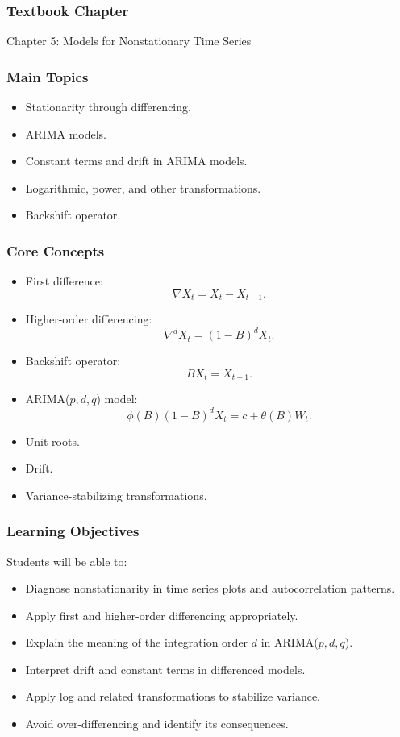 \documentclass[11pt]{article}
\begin{document}
\subsubsection*{Textbook Chapter}
Chapter 5: Models for Nonstationary Time Series

\subsubsection*{Main Topics}
\begin{itemize}
    \item Stationarity through differencing.
    \item ARIMA models.
    \item Constant terms and drift in ARIMA models.
    \item Logarithmic, power, and other transformations.
    \item Backshift operator.
\end{itemize}

\subsubsection*{Core Concepts}
\begin{itemize}
    \item First difference:
    \[
        \nabla X_t = X_t - X_{t-1}.
    \]
    \item Higher-order differencing:
    \[
        \nabla^d X_t = (1-B)^dX_t.
    \]
    \item Backshift operator:
    \[
        BX_t = X_{t-1}.
    \]
    \item ARIMA($p,d,q$) model:
    \[
        \phi(B)(1-B)^dX_t = c + \theta(B)W_t.
    \]
    \item Unit roots.
    \item Drift.
    \item Variance-stabilizing transformations.
\end{itemize}

\subsubsection*{Learning Objectives}
Students will be able to:
\begin{itemize}
    \item Diagnose nonstationarity in time series plots and autocorrelation patterns.
    \item Apply first and higher-order differencing appropriately.
    \item Explain the meaning of the integration order $d$ in ARIMA($p,d,q$).
    \item Interpret drift and constant terms in differenced models.
    \item Apply log and related transformations to stabilize variance.
    \item Avoid over-differencing and identify its consequences.
\end{itemize}
\end{document}
